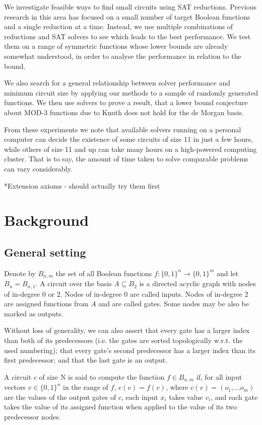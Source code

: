 \documentclass{article}
\begin{document}
We investigate feasible ways to find small circuits using SAT reductions. Previous research in this area has focused on a small number of target Boolean functions and a single reduction at a time. Instead, we use multiple combinations of reductions and SAT solvers to see which leads to the best performance. We test them on a range of symmetric functions whose lower bounds are already somewhat understood, in order to analyse the performance in relation to the bound. 

We also search for a general relationship between solver performance and minimum circuit size by applying our methods to a sample of randomly generated functions. We then use solvers to prove a result, that a lower bound conjecture about MOD-3 functions due to Knuth\cite{knuth15} does not hold for the de Morgan basis. 

From these experiments we note that available solvers running on a personal computer can decide the existence of some circuits of size 11 in just a few hours, while others of size 11 and up can take many hours on a high-powered computing cluster. That is to say, the amount of time taken to solve comparable problems can vary considerably.

*Extension axioms - should actually try them first


\section{Background}

\subsection{General setting}

Denote by \(B_{n,m}\) the set of all Boolean functions \(f: \{0,1\}^n \to \{0,1\}^m\) and let \(B_n = B_{n,1}\). A circuit over the basis \(A \subseteq B_2\) is a directed acyclic graph with nodes of in-degree 0 or 2. Nodes of in-degree 0 are called inputs. Nodes of in-degree 2 are assigned functions from \(A\) and are called gates. Some nodes may be also be marked as outputs.

Without loss of generality, we can also assert that every gate has a larger index than both of its predecessors (i.e. the gates are sorted topologically w.r.t. the used numbering); that every gate's second predecessor has a larger index than its first predecessor; and that the last gate is an output.~\cite{kulikov}

A circuit \(c\) of size N is said to compute the function \(f\in B_{n,m}\) if, for all input vectors \(v\in\{0,1\}^n\) in the range of \(f\), \(c(v)=f(v)\), where \(c(v) = (o_1,...o_m)\) are the values of the output gates of \(c\), each input \(x_i\) takes value \(v_i\), and each gate takes the value of its assigned function when applied to the value of its two predecessor nodes.
\end{document}
